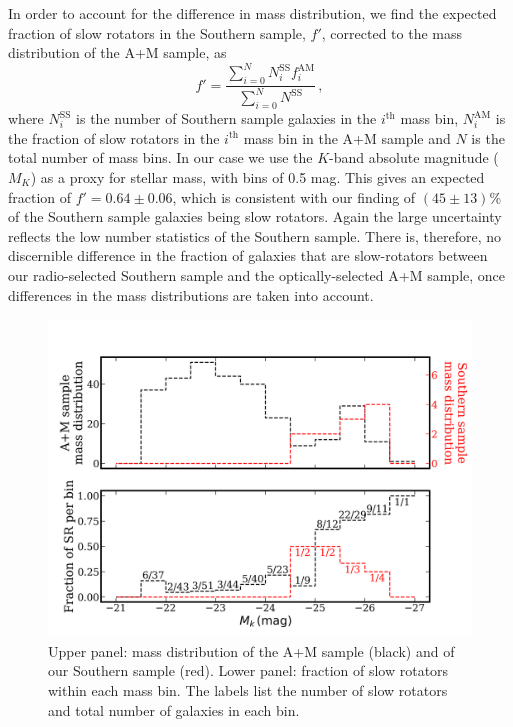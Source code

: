 \documentclass[a4paper,fleqn,usenatbib]{mnras}
\begin{document}
		In order to account for the difference in mass distribution, we find the expected fraction of slow rotators in the Southern sample, $f'$, corrected to the mass distribution of the A+M sample, as
		\begin{equation}
			f' = \frac{\sum_{i=0}^N N^\mathrm{SS}_i f^\mathrm{AM}_i}{\sum_{i=0}^N N^\mathrm{SS}} \, , 
		\end{equation}
		where $N^\text{SS}_i$ is the number of Southern sample galaxies in the $i^\text{th}$ mass bin, $N^\text{AM}_i$ is the fraction of slow rotators in the $i^\text{th}$ mass bin in the A+M sample and $N$ is the total number of mass bins. In our case we use the $K$-band absolute magnitude ($M_K$) as a proxy for stellar mass, with bins of 0.5 mag. This gives an expected fraction of $f' = 0.64 \pm 0.06$, which is consistent with our finding of $(45\pm13)$\% of the Southern sample galaxies being slow rotators. Again the large uncertainty reflects the low number statistics of the Southern sample. There is, therefore, no discernible difference in the fraction of galaxies that are slow-rotators between our radio-selected Southern sample and the optically-selected A+M sample, once differences in the mass distributions are taken into account. 

		\begin{figure}
			\includegraphics[width=\columnwidth]{M_k_binned.png}
			\caption{Upper panel: mass distribution of the A+M sample (black) and of our Southern sample (red). Lower panel: fraction of slow rotators within each mass bin. The labels list the number of slow rotators and total number of galaxies in each bin.}
			\label{fig:SRmassFraction}
		\end{figure}
\end{document}
